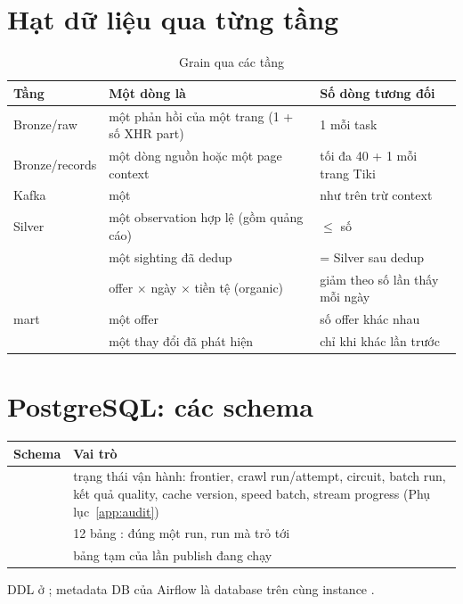 \section{Hạt dữ liệu qua từng tầng}
\begin{xltabular}{\linewidth}{@{}L{48mm}L{50mm}Y@{}}
  \caption{Grain qua các tầng}\label{tab:grain}\\
  \toprule
  \textbf{Tầng} & \textbf{Một dòng là} & \textbf{Số dòng tương đối} \\
  \midrule
  Bronze/raw & một phản hồi của một trang (1 + số XHR part) & 1 mỗi task \\
  Bronze/records & một dòng nguồn hoặc một page context & tối đa 40 + 1 mỗi trang Tiki \\
  Kafka  & một  & như trên trừ context \\
  Silver  & một observation hợp lệ (gồm quảng cáo) & $\le$ số  \\
   & một sighting đã dedup & = Silver sau dedup \\
   & offer $\times$ ngày $\times$ tiền tệ (organic) & giảm theo số lần thấy mỗi ngày \\
  mart  & một offer & số offer khác nhau \\
   & một thay đổi đã phát hiện & chỉ khi khác lần trước \\
  \bottomrule
\end{xltabular}

\section{PostgreSQL: các schema}
\begin{xltabular}{\linewidth}{@{}L{22mm}Y@{}}
  \toprule
  \textbf{Schema} & \textbf{Vai trò} \\
  \midrule
   & trạng thái vận hành: frontier, crawl run/attempt, circuit, batch run, kết quả quality, cache version, speed batch, stream progress (Phụ lục~\ref{app:audit}) \\
   & 12 bảng : đúng một run, run mà  trỏ tới \\
   & bảng tạm  của lần publish đang chạy \\
  \bottomrule
\end{xltabular}
DDL ở ; metadata DB của Airflow là database  trên cùng instance .
